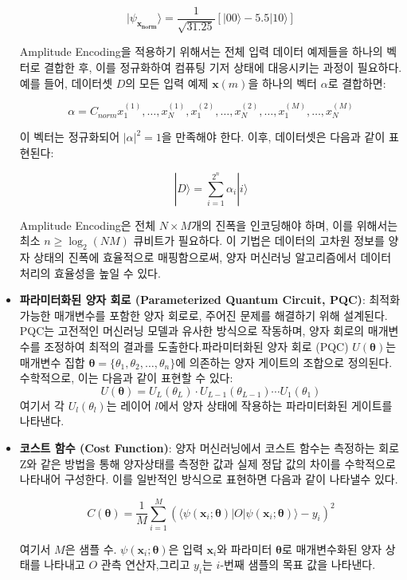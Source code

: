 \begin{itemize}
    \[
    |\psi_{\mathbf{x_{norm}}}\rangle = \frac{1}{\sqrt{31.25}} \left[ |00\rangle - 5.5|10\rangle \right]
    \]

    Amplitude Encoding을 적용하기 위해서는 전체 입력 데이터 예제들을 하나의 벡터로 결합한 후, 이를 정규화하여 컴퓨팅 기저 상태에 대응시키는 과정이 필요하다. 예를 들어, 데이터셋 \( D \)의 모든 입력 예제 \( \mathbf{x}(m) \)을 하나의 벡터 \( \alpha \)로 결합하면:

    \[
    \alpha = C_{norm} x^{(1)}_1, \ldots, x^{(1)}_N, x^{(2)}_1, \ldots, x^{(2)}_N, \ldots, x^{(M)}_1, \ldots, x^{(M)}_N
    \]

    이 벡터는 정규화되어 \( |\alpha|^2 = 1 \)을 만족해야 한다. 이후, 데이터셋은 다음과 같이 표현된다:

    \[
    |D\rangle = \sum_{i=1}^{2^n} \alpha_i |i\rangle
    \]

    Amplitude Encoding은 전체 \( N \times M \)개의 진폭을 인코딩해야 하며, 이를 위해서는 최소 \( n \geq \log_2(NM) \) 큐비트가 필요하다. 이 기법은 데이터의 고차원 정보를 양자 상태의 진폭에 효율적으로 매핑함으로써, 양자 머신러닝 알고리즘에서 데이터 처리의 효율성을 높일 수 있다.

    \item \textbf{파라미터화된 양자 회로 (Parameterized Quantum Circuit, PQC)}: 최적화 가능한 매개변수를 포함한 양자 회로로, 주어진 문제를 해결하기 위해 설계된다. PQC는 고전적인 머신러닝 모델과 유사한 방식으로 작동하며, 양자 회로의 매개변수를 조정하여 최적의 결과를 도출한다.파라미터화된 양자 회로 (PQC) \( U(\boldsymbol{\theta}) \)는 매개변수 집합 \( \boldsymbol{\theta} = \{\theta_1, \theta_2, \ldots, \theta_n\} \)에 의존하는 양자 게이트의 조합으로 정의된다. 수학적으로, 이는 다음과 같이 표현할 수 있다:
    \[
        U(\boldsymbol{\theta}) = U_L(\theta_L) \cdot U_{L-1}(\theta_{L-1}) \cdots U_1(\theta_1)
    \]
    여기서 각 \( U_l(\theta_l) \)는 레이어 \( l \)에서 양자 상태에 작용하는 파라미터화된 게이트를 나타낸다.

    \item \textbf{코스트 함수 (Cost Function)}: 양자 머신러닝에서 코스트 함수는  측정하는 회로 Z와 같은 방법을 통해 양자상태를 측정한 값과 실제 정답 값의 차이를 수학적으로 나타내어 구성한다. 이를 일반적인 방식으로 표현하면 다음과 같이 나타낼수 있다.

    \[
    C(\boldsymbol{\theta}) = \frac{1}{M} \sum_{i=1}^{M} \left( \langle \psi(\mathbf{x}_i; \boldsymbol{\theta}) | O | \psi(\mathbf{x}_i; \boldsymbol{\theta}) \rangle - y_i \right)^2
    \]

    여기서 \( M \)은  샘플 수.  \( \psi(\mathbf{x}_i; \boldsymbol{\theta}) \)은 입력 \( \mathbf{x}_i \)와 파라미터 \( \boldsymbol{\theta} \)로 매개변수화된 양자 상태를 나타내고 \( O \) 관측 연산자,그리고
       \( y_i \)는 \( i \)-번째 샘플의 목표 값을 나타낸다.

\end{itemize}

